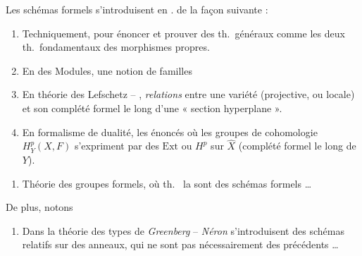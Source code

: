 \documentclass[11pt,a4paper]{article}
\begin{document}
Les schémas formels s'introduisent en .
 de la façon suivante :

\begin{enumerate}
  \item[1)] Techniquement, pour énoncer et prouver des th.\ généraux comme les
    deux th.\ fondamentaux des morphismes propres.
  \item[3)] En  des Modules, \ill{}
    \struck{\ill{}} une notion de familles \ill{}
  \item[2)] En théorie des Lefschetz -- , \ill{}
     \ill{} \emph{relations} entre une
    variété (projective, ou locale) et son complété formel le long d'une
    « section hyperplane ».
  \item[4)] En formalisme de dualité, les énoncés où les groupes de cohomologie
    $H^{p}_{Y}(X, F)$ s'expriment par des $\mathrm{Ext}$ ou $H^{p}$ sur
    $\hat{X}$ (complété formel le long de $Y$).
\end{enumerate}



\begin{enumerate}
  \item[5)] Théorie des groupes formels, où  th.\ \ill{} la
    \ill{} sont \ill{} des schémas formels \ldots
\end{enumerate}

De plus, notons

\begin{enumerate}
  \item[6)] Dans la théorie des types de \emph{Greenberg} -- \emph{Néron}
    s'introduisent des schémas relatifs sur des \ill{} anneaux, qui ne sont pas
    nécessairement \ill{} des précédents \ldots
\end{enumerate}

\end{document}
